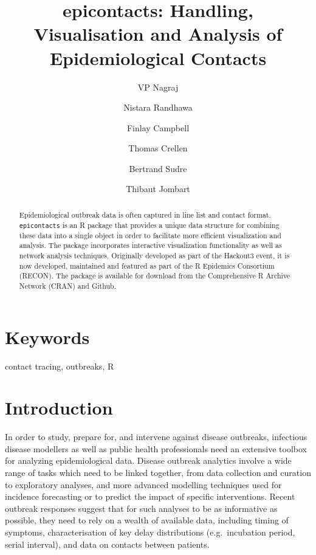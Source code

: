 \documentclass[9pt,a4paper,]{extarticle}
\theoremstyle{definition}
\theoremstyle{definition}
\theoremstyle{definition}
\theoremstyle{remark}
\begin{document}
\pagestyle{front}

\title{epicontacts: Handling, Visualisation and Analysis of Epidemiological Contacts}

\author[1]{VP Nagraj}
\author[2]{Nistara Randhawa}
\author[3]{Finlay Campbell}
\author[4]{Thomas Crellen}
\author[5]{Bertrand Sudre}
\author[3]{Thibaut Jombart}

\maketitle
\thispagestyle{front}

\begin{abstract}
Epidemiological outbreak data is often captured in line list and contact format. \texttt{epicontacts} is an R package that provides a unique data structure for combining these data into a single object in order to facilitate more efficient visualization and analysis. The package incorporates interactive visualization functionality as well as network analysis techniques. Originally developed as part of the Hackout3 event, it is now developed, maintained and featured as part of the R Epidemics Consortium (RECON). The package is available for download from the Comprehensive R Archive Network (CRAN) and Github.
\end{abstract}

\section*{Keywords}
contact tracing, outbreaks, R


\clearpage
\pagestyle{main}

\section{Introduction}\label{introduction}

In order to study, prepare for, and intervene against disease outbreaks, infectious disease modellers as well as public health professionals need an extensive toolbox for analyzing epidemiological data. Disease outbreak analytics involve a wide range of tasks which need to be linked together, from data collection and curation to exploratory analyses, and more advanced modelling techniques used for incidence forecasting\citep{funk:2016}\citep{nouvellet:2017} or to predict the impact of specific interventions\citep{nouvellet:2015}\citep{parker:2015}. Recent outbreak responses suggest that for such analyses to be as informative as possible, they need to rely on a wealth of available data, including timing of symptoms, characterisation of key delay distributions (e.g.~incubation period, serial interval), and data on contacts between patients\citep{cauchemez:2014}\citep{aylward:2014}\citep{agua-agum:2015}\citep{cori:2017}.
\end{document}
